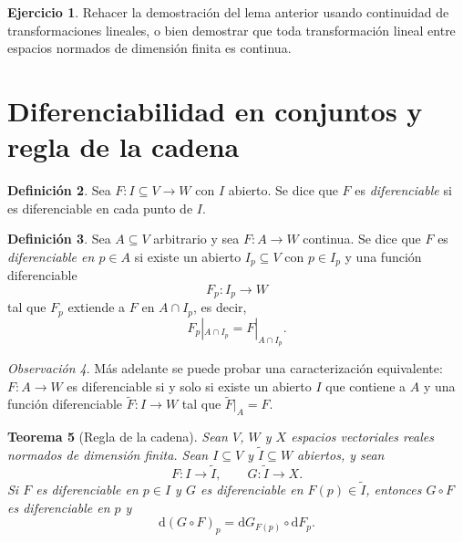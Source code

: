 \documentclass[11pt]{article}
\newtheorem{theorem}{Teorema}
\theoremstyle{definition}
\newtheorem{definition}[theorem]{Definici\'on}
\newtheorem{exercise}[theorem]{Ejercicio}
\theoremstyle{remark}
\newtheorem{remark}[theorem]{Observaci\'on}
\newcommand{\dd}{\mathrm{d}}
\begin{document}
\begin{exercise}
Rehacer la demostraci\'on del lema anterior usando continuidad de transformaciones lineales, o bien demostrar que toda transformaci\'on lineal entre espacios normados de dimensi\'on finita es continua.
\end{exercise}

\section*{Diferenciabilidad en conjuntos y regla de la cadena}

\begin{definition}
Sea $F \colon I \subseteq V \to W$ con $I$ abierto. Se dice que $F$ es \emph{diferenciable} si es diferenciable en cada punto de $I$.
\end{definition}

\begin{definition}
Sea $A\subseteq V$ arbitrario y sea $F \colon A \to W$ continua. Se dice que $F$ es \emph{diferenciable en $p\in A$} si existe un abierto $I_p\subseteq V$ con $p\in I_p$ y una funci\'on diferenciable
\[
F_p \colon I_p \to W
\]
tal que $F_p$ extiende a $F$ en $A\cap I_p$, es decir,
\[
F_p|_{A\cap I_p}=F|_{A\cap I_p}.
\]
\end{definition}

\begin{remark}
M\'as adelante se puede probar una caracterizaci\'on equivalente: $F \colon A \to W$ es diferenciable si y solo si existe un abierto $I$ que contiene a $A$ y una funci\'on diferenciable $\widetilde{F}\colon I\to W$ tal que $\widetilde{F}|_A=F$.
\end{remark}

\begin{theorem}[Regla de la cadena]
Sean $V$, $W$ y $X$ espacios vectoriales reales normados de dimensi\'on finita. Sean $I\subseteq V$ y $\widetilde{I}\subseteq W$ abiertos, y sean
\[
F \colon I \to \widetilde{I},
\qquad
G \colon \widetilde{I} \to X.
\]
Si $F$ es diferenciable en $p\in I$ y $G$ es diferenciable en $F(p)\in \widetilde{I}$, entonces $G\circ F$ es diferenciable en $p$ y
\[
\dd(G\circ F)_p
=
\dd G_{F(p)} \circ \dd F_p.
\]
\end{theorem}
\end{document}
